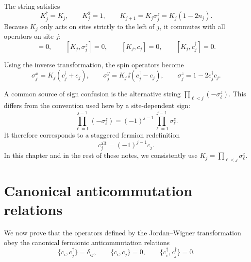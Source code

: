 The string satisfies
\begin{equation}
    K_j^\dagger=K_j,
    \qquad
    K_j^2=1,
    \qquad
    K_{j+1}=K_j\sigma_j^z=K_j(1-2n_j).
\end{equation}
Because \(K_j\) only acts on sites strictly to the left of \(j\), it commutes with all
operators on site \(j\):
\begin{equation}
    [K_j,\sigma_j^\pm]=0,
    \qquad
    [K_j,\sigma_j^z]=0,
    \qquad
    [K_j,c_j]=0,
    \qquad
    [K_j,c_j^\dagger]=0.
\end{equation}

Using the inverse transformation, the spin operators become
\begin{equation}
\label{eq:spin-operators-jw}
    \sigma_j^x
    =
    K_j(c_j^\dagger+c_j),
    \qquad
    \sigma_j^y
    =
    K_j\,\ii(c_j^\dagger-c_j),
    \qquad
    \sigma_j^z
    =
    1-2c_j^\dagger c_j .
\end{equation}

\begin{remark}
A common source of sign confusion is the alternative string
\(\prod_{\ell<j}(-\sigma_\ell^z)\). This differs from the convention used here by
a site-dependent sign:
\begin{equation}
    \prod_{\ell=1}^{j-1}(-\sigma_\ell^z)
    =
    (-1)^{j-1}
    \prod_{\ell=1}^{j-1}\sigma_\ell^z .
\end{equation}
It therefore corresponds to a staggered fermion redefinition
\begin{equation}
    c_j^{\mathrm{alt}} = (-1)^{j-1}c_j .
\end{equation}
In this chapter and in the rest of these notes, we consistently use
\(K_j=\prod_{\ell<j}\sigma_\ell^z\).
\end{remark}

\section{Canonical anticommutation relations}

We now prove that the operators defined by the Jordan--Wigner transformation obey
the canonical fermionic anticommutation relations
\begin{equation}
\label{eq:canonical-fermion-algebra}
    \{c_i,c_j^\dagger\}=\delta_{ij},
    \qquad
    \{c_i,c_j\}=0,
    \qquad
    \{c_i^\dagger,c_j^\dagger\}=0.
\end{equation}

